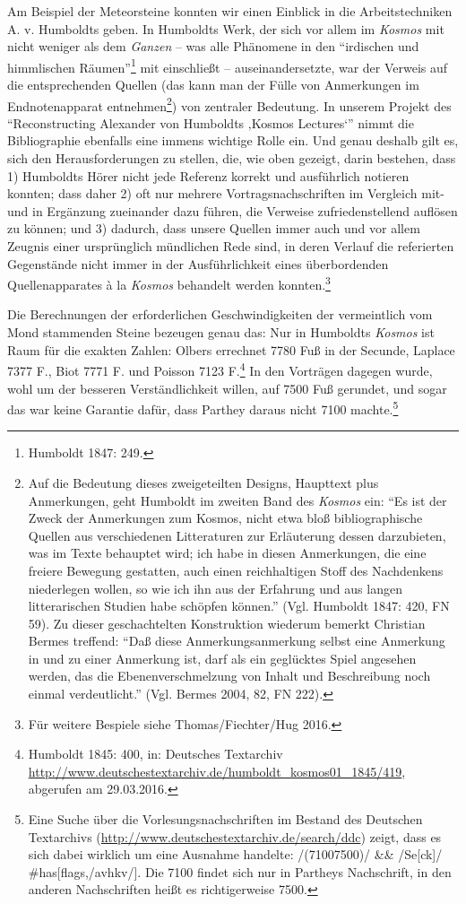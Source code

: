 \documentclass[a4paper,
fontsize=11pt,
oneside,
numbers=noperiodatend,
parskip=half-,
bibliography=totoc,
final
]{scrartcl}
\begin{document}
Am Beispiel der Meteorsteine konnten wir einen Einblick in die
Arbeitstechniken A. v. Humboldts geben. In Humboldts Werk, der sich vor
allem im \emph{Kosmos} mit nicht weniger als dem \emph{Ganzen} -- was
alle Phänomene in den \enquote{irdischen und himmlischen
Räumen}\footnote{Humboldt 1847: 249.} mit einschließt --
auseinandersetzte, war der Verweis auf die entsprechenden Quellen (das
kann man der Fülle von Anmerkungen im Endnotenapparat
entnehmen\footnote{Auf die Bedeutung dieses zweigeteilten Designs,
  Haupttext plus Anmerkungen, geht Humboldt im zweiten Band des
  \emph{Kosmos} ein: \enquote{Es ist der Zweck der Anmerkungen zum
  Kosmos, nicht etwa bloß bibliographische Quellen aus verschiedenen
  Litteraturen zur Erläuterung dessen darzubieten, was im Texte
  behauptet wird; ich habe in diesen Anmerkungen, die eine freiere
  Bewegung gestatten, auch einen reichhaltigen Stoff des Nachdenkens
  niederlegen wollen, so wie ich ihn aus der Erfahrung und aus langen
  litterarischen Studien habe schöpfen können.} (Vgl. Humboldt 1847:
  420, FN 59). Zu dieser geschachtelten Konstruktion wiederum bemerkt
  Christian Bermes treffend: \enquote{Daß diese Anmerkungsanmerkung
  selbst eine Anmerkung in und zu einer Anmerkung ist, darf als ein
  geglücktes Spiel angesehen werden, das die Ebenenverschmelzung von
  Inhalt und Beschreibung noch einmal verdeutlicht.} (Vgl. Bermes 2004,
  82, FN 222).}) von zentraler Bedeutung. In unserem Projekt des
\enquote{Reconstructing Alexander von Humboldts ‚Kosmos Lectures`} nimmt
die Bibliographie ebenfalls eine immens wichtige Rolle ein. Und genau
deshalb gilt es, sich den Herausforderungen zu stellen, die, wie oben
gezeigt, darin bestehen, dass 1) Humboldts Hörer nicht jede Referenz
korrekt und ausführlich notieren konnten; dass daher 2) oft nur mehrere
Vortragsnachschriften im Vergleich mit- und in Ergänzung zueinander dazu
führen, die Verweise zufriedenstellend auflösen zu können; und 3)
dadurch, dass unsere Quellen immer auch und vor allem Zeugnis einer
ursprünglich mündlichen Rede sind, in deren Verlauf die referierten
Gegenstände nicht immer in der Ausführlichkeit eines überbordenden
Quellenapparates à la \emph{Kosmos} behandelt werden konnten.\footnote{Für
  weitere Bespiele siehe Thomas/Fiechter/Hug 2016.}

Die Berechnungen der erforderlichen Geschwindigkeiten der vermeintlich
vom Mond stammenden Steine bezeugen genau das: Nur in Humboldts
\emph{Kosmos} ist Raum für die exakten Zahlen: Olbers errechnet 7780 Fuß
in der Secunde, Laplace 7377 F., Biot 7771 F. und Poisson 7123
F.\footnote{Humboldt 1845: 400, in: Deutsches Textarchiv
  \url{http://www.deutschestextarchiv.de/humboldt_kosmos01_1845/419},
  abgerufen am 29.03.2016.} In den Vorträgen dagegen wurde, wohl um der
besseren Verständlichkeit willen, auf 7500 Fuß gerundet, und sogar das
war keine Garantie dafür, dass Parthey daraus nicht 7100
machte.\footnote{Eine Suche über die Vorlesungsnachschriften im Bestand
  des Deutschen Textarchivs
  (\url{http://www.deutschestextarchiv.de/search/ddc}) zeigt, dass es
  sich dabei wirklich um eine Ausnahme handelte: /(7100\textbar{}7500)/
  \&\& /Se{[}ck{]}/ \#has{[}flags,/avhkv/{]}. Die 7100 findet sich nur
  in Partheys Nachschrift, in den anderen Nachschriften heißt es
  richtigerweise 7500.}
\end{document}
